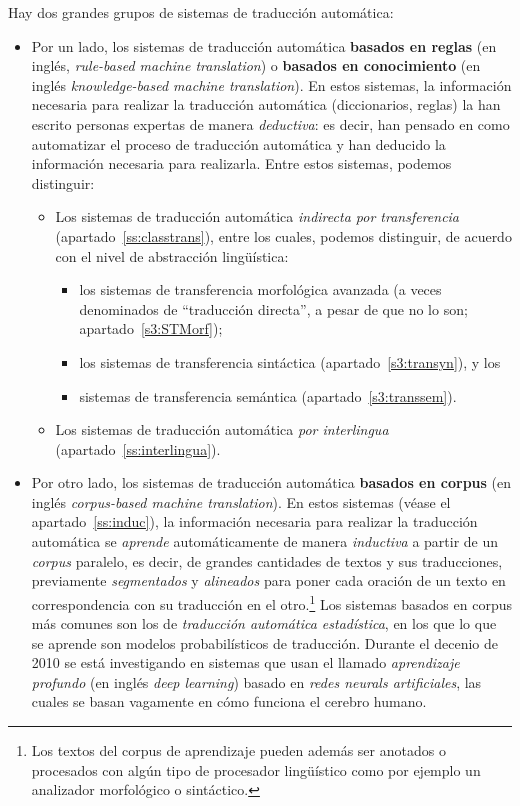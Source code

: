Hay dos grandes grupos de sistemas de traducción automática: \begin{itemize} \item Por un lado, los sistemas de traducción automática \textbf{basados en reglas} (en inglés, \emph{rule-based machine translation}) o \textbf{basados en conocimiento} (en inglés \emph{knowledge-based machine translation}). En estos sistemas, la información necesaria para realizar la traducción automática (diccionarios, reglas) la han escrito personas expertas de manera \emph{deductiva}: es decir, han pensado en como automatizar el proceso de traducción automática y  han deducido la información necesaria para realizarla. Entre estos sistemas, podemos distinguir: \begin{itemize} \item Los sistemas de traducción automática \emph{indirecta por transferencia} (apartado~\ref{ss:classtrans}), entre los cuales, podemos distinguir, de acuerdo con el nivel de abstracción lingüística: \begin{itemize} \item los sistemas de transferencia morfológica avanzada (a veces denominados de ``traducción directa'', a pesar de que no lo son; apartado~\ref{s3:STMorf}); \item los sistemas de transferencia sintáctica (apartado~\ref{s3:transyn}), y los \item sistemas de transferencia semántica (apartado~\ref{s3:transsem}). \end{itemize} \item Los sistemas de traducción automática \emph{por interlingua} (apartado~\ref{ss:interlingua}). \end{itemize} \item Por otro lado, los sistemas de traducción automática \textbf{basados en corpus} (en inglés \emph{corpus-based machine translation}). En estos sistemas (véase el apartado~\ref{ss:induc}), la información necesaria para realizar la traducción automática se \emph{aprende} automáticamente de manera \emph{inductiva} a partir de un \emph{corpus} paralelo, es decir, de grandes cantidades de textos y sus traducciones, previamente \emph{segmentados} y \emph{alineados} para poner cada oración de un texto en correspondencia con su traducción en el otro.\footnote{Los textos del corpus de aprendizaje pueden además ser anotados o procesados con algún tipo de procesador lingüístico como por ejemplo un analizador morfológico o sintáctico.} Los sistemas basados en corpus más comunes son los de \emph{traducción automática estadística}, en los que lo que se aprende son modelos probabilísticos de traducción. Durante el decenio de 2010 se está investigando en sistemas que usan el llamado \emph{aprendizaje profundo} (en inglés \emph{deep learning}) basado en \emph{redes neurals artificiales}, las cuales se basan vagamente en cómo funciona el cerebro humano. \end{itemize} 

